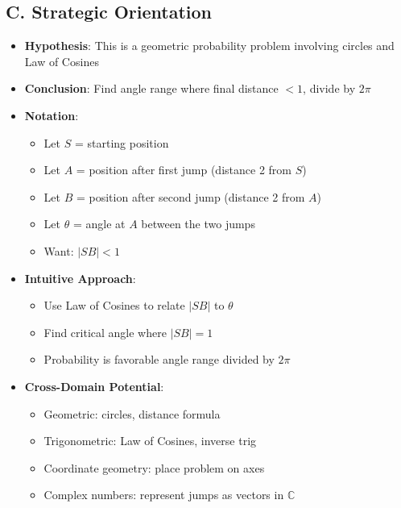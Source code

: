 \documentclass[12pt]{article}
\begin{document}
\begin{problemconfigbox}
\subsection*{C. Strategic Orientation}
\begin{itemize}[leftmargin=*]
    \item \textbf{Hypothesis}: This is a geometric probability problem involving circles and Law of Cosines
    \item \textbf{Conclusion}: Find angle range where final distance $< 1$, divide by $2\pi$
    \item \textbf{Notation}: 
    \begin{itemize}
        \item Let $S$ = starting position
        \item Let $A$ = position after first jump (distance 2 from $S$)
        \item Let $B$ = position after second jump (distance 2 from $A$)
        \item Let $\theta$ = angle at $A$ between the two jumps
        \item Want: $|SB| < 1$
    \end{itemize}
    \item \textbf{Intuitive Approach}: 
    \begin{itemize}
        \item Use Law of Cosines to relate $|SB|$ to $\theta$
        \item Find critical angle where $|SB| = 1$
        \item Probability is favorable angle range divided by $2\pi$
    \end{itemize}
    \item \textbf{Cross-Domain Potential}: 
    \begin{itemize}
        \item Geometric: circles, distance formula
        \item Trigonometric: Law of Cosines, inverse trig
        \item Coordinate geometry: place problem on axes
        \item Complex numbers: represent jumps as vectors in $\mathbb{C}$
    \end{itemize}
\end{itemize}
\end{problemconfigbox}
\end{document}
